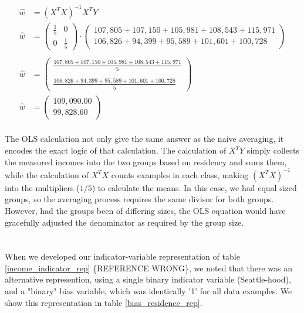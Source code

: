\begin{align} 
\hat{w} &= (X^T X)^{-1} X^T Y 
\\
\hat{w} &= 
\left(\begin{array}{cc}
          \frac{1}{5} & 0 \\
          0           & \frac{1}{5} 
\end{array}\right)
\cdot
\left(\begin{array}{c}
         107,805 + 107,150 + 105,981 + 108,543 + 115,971 \\
         106,826 +  94,399 +  95,589 + 101,601 + 100,728 
\end{array}\right)
\\
\\
\hat{w} &= 
\left(\begin{array}{c}
         \displaystyle\frac{107,805 + 107,150 + 105,981 + 108,543 + 115,971}{5} \\
         \\
         \displaystyle\frac{106,826 +  94,399 +  95,589 + 101,601 + 100,728}{5} 
\end{array}\right)
\\
\hat{w} &= 
\left(\begin{array}{c}
          109,090.00 \\
          99,828.60
\end{array}\right)
\end{align}
\\
The OLS calculation not only give the same answer as the naive averaging, it
encodes the exact logic of that calculation.  The calculation of $X^T Y$ simply
collects the measured incomes into the two groups based on residency and sums
them, while the calculation of $X^T X$ counts examples in each class, making
$(X^T X)^{-1}$ into the multipliers ($1/5$) to calculate the means. In this
case, we had equal sized groups, so the averaging process requires the same
divisor for both groups.  However, had the groups been of differing sizes, the
OLS equation would have gracefully adjusted the denominator as required by the
group size.\\
\\
\\
When we developed our indicator-variable representation of table
\ref{income_indicator_rep} \{REFERENCE WRONG\}, we noted that there was an
alternative represention, using a single binary indicator variable
(Seattle-hood), and a "binary" bias variable, which was identically '1' for all
data examples.  We show this representation in table \ref{bias_residence_rep}. 

